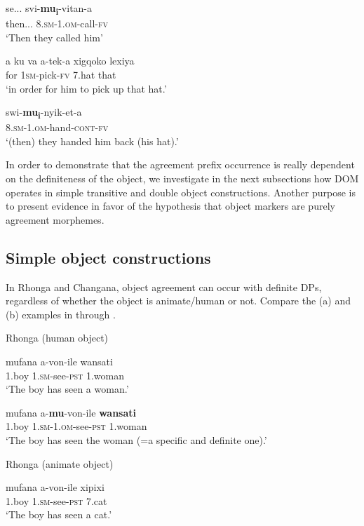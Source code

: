 \documentclass[output=paper]{langsci/langscibook}
\begin{document}
\ea
\gll se...         svi-\textbf{mu}\textbf{\textup{\textsubscript{i}}}{}-vitan-a\\
     then...     8.\textsc{sm-1.om}{}-call-\textsc{fv}\\
\glt ‘Then they called him’
\z

\ea
\gll a ku va       a-tek-a              xigqoko       lexiya\\
     for             1\textsc{sm}{}-pick-\textsc{fv}      7.hat             that\\
\glt ‘in order for him to pick up that hat.’
\z

\ea
\gll swi-\textbf{mu}\textbf{\textup{\textsubscript{i}}}{}-nyik-et-a\\
     8.\textsc{sm}{}-1.\textsc{om}{}-hand-\textsc{cont}{}-\textsc{fv}\\
\glt ‘(then) they handed him back (his hat).’
\z

{In order to demonstrate that the agreement prefix occurrence is really dependent on the definiteness of the object, we investigate in the next subsections how DOM operates in simple transitive and double object constructions. Another purpose is to present evidence in favor of the hypothesis that object markers are purely agreement morphemes.}
\subsection{Simple object constructions}

In Rhonga and Changana, object agreement can occur with definite DPs, regardless of whether the object is animate/human or not. Compare the (a) and (b) examples in  through .

{Rhonga (human object)}

\ea
\gll mufana         a-von-ile                  wansati\\
     1.boy           1.\textsc{sm}{}-see-\textsc{pst}            1.woman\\
\glt ‘The boy has seen a woman.’
\z

\ea
\gll mufana    a-\textbf{mu}{}-von-ile             \textbf{wansati}\\
     1.boy     1\textsc{.sm-1.om}{}-see-\textsc{pst}     1.woman\\
\glt ‘The boy has seen the woman (=a specific and definite one).’
\z

{Rhonga (animate object)}

\ea
\gll mufana       a-von-ile                    xipixi\\
     1.boy          1.\textsc{sm}{}-see-\textsc{pst }             7.cat\\
\glt ‘The boy has seen a cat.’
\z
\end{document}
